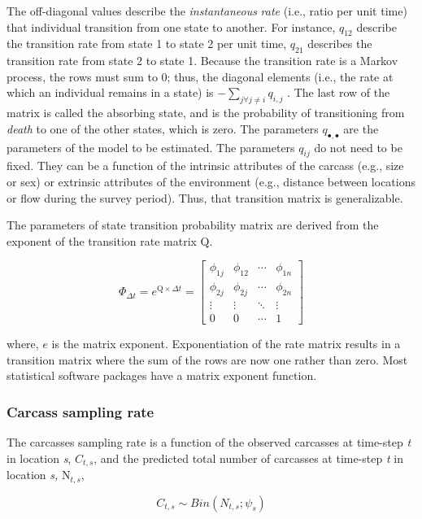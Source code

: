 \documentclass[
  letterpaper,
  DIV=11,
  numbers=noendperiod]{scrartcl}
\begin{document}
The off-diagonal values describe the \emph{instantaneous} \emph{rate}
(i.e., ratio per unit time) that individual transition from one state to
another. For instance, \(q_{12}\) describe the transition rate from
state 1 to state 2 per unit time, \(q_{21}\) describes the transition
rate from state 2 to state 1. Because the transition rate is a Markov
process, the rows must sum to 0; thus, the diagonal elements (i.e., the
rate at which an individual remains in a state) is
\(-\sum_{j\forall j\neq i}q_{i,j}\) . The last row of the matrix is
called the absorbing state, and is the probability of transitioning from
\emph{death} to one of the other states, which is zero. The parameters
\(q_{\bullet,\bullet}\) are the parameters of the model to be estimated.
The parameters \(q_{ij}\) do not need to be fixed. They can be a
function of the intrinsic attributes of the carcass (e.g., size or sex)
or extrinsic attributes of the environment (e.g., distance between
locations or flow during the survey period). Thus, that transition
matrix is generalizable.

The parameters of state transition probability matrix are derived from
the exponent of the transition rate matrix \(\mathrm{Q}\).

\[
\Phi_{\Delta t} = e^{\mathrm{Q}\times \Delta t} =  \begin{bmatrix} \phi_{1j} & \phi_{12} & \cdots & \phi_{1n} \\ \phi_{2j} & \phi_{2j} & \cdots & \phi_{2n} \\ \vdots & \vdots & \ddots & \vdots \\ 0 & 0 & \cdots & 1 \end{bmatrix}
\]

where, \(e\) is the matrix exponent. Exponentiation of the rate matrix
results in a transition matrix where the sum of the rows are now one
rather than zero. Most statistical software packages have a matrix
exponent function.

\hypertarget{carcass-sampling-rate}{%
\subsubsection{Carcass sampling rate}\label{carcass-sampling-rate}}

The carcasses sampling rate is a function of the observed carcasses at
time-step \emph{t} in location \emph{s}, \(C_{t,s}\), and the predicted
total number of carcasses at time-step \emph{t} in location \emph{s,}
\(\mathrm{N}_{t,s}\),

\[
C_{t,s} \sim Bin(N_{t,s}; \psi_s)
\]
\end{document}
